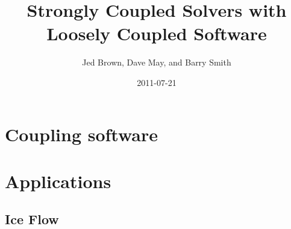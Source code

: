 \documentclass{beamer}
\title{Strongly Coupled Solvers with Loosely Coupled Software}
\author{Jed Brown\inst{1,2}, Dave May\inst{2}, and Barry Smith\inst{1}}
\institute
{
  \inst{1}{Argonne National Laboratory} \\
  \inst{2}{ETH Z\"urich}
}
\date{2011-07-21}
\begin{document}
\lstset{language=C}
\normalem

\begin{frame}
  \titlepage
\end{frame}



\section{Coupling software}




\section{Applications}

\subsection{Ice Flow}

\end{document}
